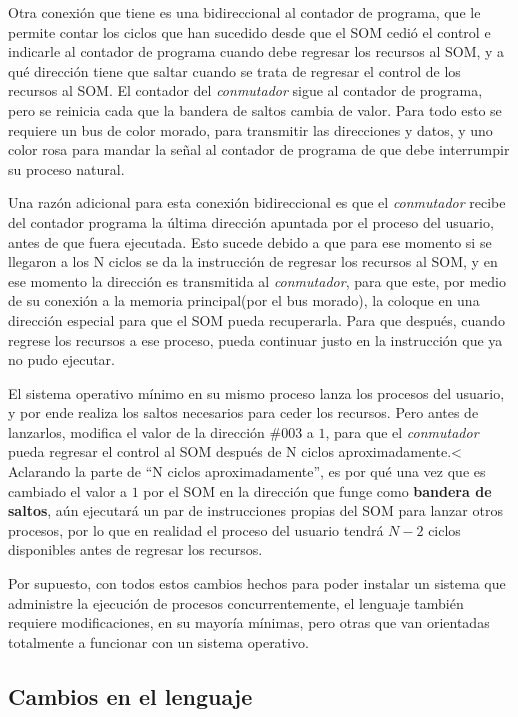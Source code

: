\documentclass[letterpaper,12pt,oneside]{book}
\begin{document}
        Otra conexión que tiene es una bidireccional al contador de programa, que le permite contar los ciclos que han sucedido desde que el SOM cedió el control e indicarle al contador de programa cuando debe regresar los recursos al SOM, y a qué dirección
		tiene que saltar cuando se trata de regresar el control de los recursos al SOM. El contador del \textit{conmutador} sigue al contador de programa, pero se reinicia cada que la bandera de saltos cambia de valor.
        Para todo esto se requiere un bus de color morado, para transmitir las direcciones y datos, y uno color rosa para mandar la señal al contador de programa de que debe interrumpir su proceso natural.
  
        Una razón adicional para esta conexión bidireccional es que el \textit{conmutador} recibe del contador programa la última dirección
		apuntada por el proceso del usuario, antes de que fuera ejecutada. Esto sucede debido a que para ese momento si se llegaron a los N ciclos se da la instrucción
		de regresar los recursos al SOM, y en ese momento la dirección es transmitida al \textit{conmutador}, para que este, por medio de su conexión a la memoria principal(por el bus morado),
		la coloque en una dirección especial para que el SOM pueda recuperarla. Para que después, cuando regrese los recursos a ese proceso, pueda continuar
		justo en la instrucción que ya no pudo ejecutar.
		
		El sistema operativo mínimo en su mismo proceso lanza los procesos del usuario, y por ende realiza los saltos necesarios para ceder los recursos. Pero antes de lanzarlos,		
		modifica el valor de la dirección $\#003$ a $1$, para que el \textit{conmutador} pueda regresar el control al SOM después de N ciclos aproximadamente.< Aclarando
		la parte de ``N ciclos aproximadamente'', es por qué
		una vez que es cambiado el valor a $1$ por el SOM en la dirección que funge como \textbf{bandera de saltos}, aún ejecutará un par de instrucciones propias
		del SOM para lanzar otros procesos, por lo que en realidad el proceso del usuario tendrá $N-2$ ciclos disponibles antes de regresar los recursos.
		
		Por supuesto, con todos estos cambios hechos para poder instalar un sistema que administre la ejecución de procesos concurrentemente, el lenguaje también
		requiere modificaciones, en su mayoría mínimas, pero otras que van orientadas totalmente a funcionar con un sistema operativo.
		
		\subsection{Cambios en el lenguaje}
		
\end{document}
